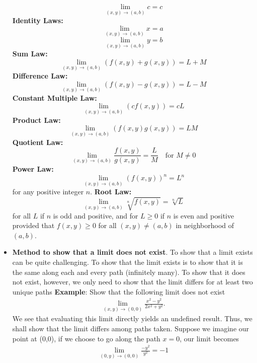 \documentclass{report}
\begin{document}
\begin{itemize}
            \[
                \lim_{(x,y) \to (a,b)} c = c \tag{4.2}
            \]
            \textbf{Identity Laws:}
            \[
                \lim_{(x,y) \to (a,b)} x = a \tag{4.3}
            \]
            \[
                \lim_{(x,y) \to (a,b)} y = b \tag{4.4}
            \]
            \textbf{Sum Law:}
            \[
                \lim_{(x,y) \to (a,b)} (f(x,y) + g(x,y)) = L + M \tag{4.5}
            \]
            \textbf{Difference Law:}
            \[
                \lim_{(x,y) \to (a,b)} (f(x,y) - g(x,y)) = L - M \tag{4.6}
            \]
            \textbf{Constant Multiple Law:}
            \[
                \lim_{(x,y) \to (a,b)} (cf(x,y)) = cL \tag{4.7}
            \]
            \textbf{Product Law:}
            \[
                \lim_{(x,y) \to (a,b)} (f(x,y)g(x,y)) = LM \tag{4.8}
            \]
            \textbf{Quotient Law:}
            \[
                \lim_{(x,y) \to (a,b)} \frac{f(x,y)}{g(x,y)} = \frac{L}{M} \quad \text{for } M \neq 0 \tag{4.9}
            \]
            \textbf{Power Law:}
            \[
                \lim_{(x,y) \to (a,b)} (f(x,y))^n = L^n \tag{4.10}
            \]
            for any positive integer $n$.
            \textbf{Root Law:}
            \[
                \lim_{(x,y) \to (a,b)} \sqrt[n]{f(x,y)} = \sqrt[n]{L} \tag{4.11}
            \]
            for all $L$ if $n$ is odd and positive, and for $L \geq 0$ if $n$ is even and positive provided that $f(x, y) \geq 0$ for all $(x, y) \neq (a, b)$ in neighborhood of $(a, b)$.
        \item \textbf{Method to show that a limit does not exist}. To show that a limit exists can be quite challenging. To show that the limit exists is to show that it is the same along each and every path (infinitely many). To show that it does not exist, however, we only need to show that the limit differs for at least two unique paths
            \bigbreak \noindent 
            \textbf{Example}: Show that the following limit does not exist
            \begin{align*}
                \lim\limits_{(x,y) \to (0,0)}{\frac{x^{2}-y^{2}}{2x^{2} + y^{2}}}
            .\end{align*}
                We see that evaluating this limit directly yields an undefined result. Thus, we shall show that the limit differs among paths taken. Suppose we imagine our point at (0,0), if we choose to go along the path $x=0$, our limit becomes
                \begin{align*}
                    \lim\limits_{(0,y) \to (0,0)}{\frac{-y^{2}}{y^{2}}} = -1

\end{align*}
\end{itemize}
\end{document}
